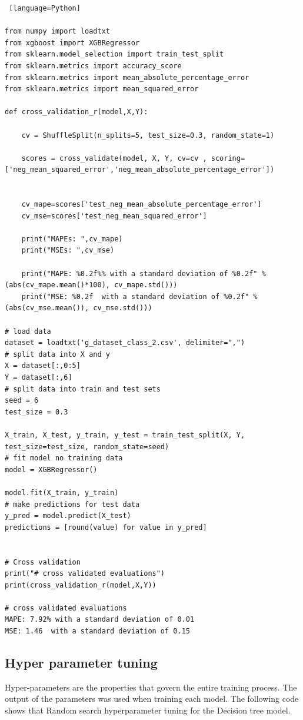 \begin{lstlisting} [language=Python]

from numpy import loadtxt
from xgboost import XGBRegressor
from sklearn.model_selection import train_test_split
from sklearn.metrics import accuracy_score
from sklearn.metrics import mean_absolute_percentage_error
from sklearn.metrics import mean_squared_error

def cross_validation_r(model,X,Y):

	cv = ShuffleSplit(n_splits=5, test_size=0.3, random_state=1)
	
	scores = cross_validate(model, X, Y, cv=cv , scoring=['neg_mean_squared_error','neg_mean_absolute_percentage_error'])
	
	
	cv_mape=scores['test_neg_mean_absolute_percentage_error']
	cv_mse=scores['test_neg_mean_squared_error']
	
	print("MAPEs: ",cv_mape)
	print("MSEs: ",cv_mse)
	
	print("MAPE: %0.2f%% with a standard deviation of %0.2f" % (abs(cv_mape.mean()*100), cv_mape.std()))
	print("MSE: %0.2f  with a standard deviation of %0.2f" % (abs(cv_mse.mean()), cv_mse.std()))
	
# load data
dataset = loadtxt('g_dataset_class_2.csv', delimiter=",")
# split data into X and y
X = dataset[:,0:5]
Y = dataset[:,6]
# split data into train and test sets
seed = 6
test_size = 0.3

X_train, X_test, y_train, y_test = train_test_split(X, Y, test_size=test_size, random_state=seed)
# fit model no training data
model = XGBRegressor()

model.fit(X_train, y_train)
# make predictions for test data
y_pred = model.predict(X_test)
predictions = [round(value) for value in y_pred]


# Cross validation
print("# cross validated evaluations")
print(cross_validation_r(model,X,Y))

# cross validated evaluations
MAPE: 7.92% with a standard deviation of 0.01
MSE: 1.46  with a standard deviation of 0.15

\end{lstlisting}


\subsection{Hyper parameter tuning}

Hyper-parameters are the properties that govern the entire training process. The output of the parameters was used when training each model. The following code shows that Random search hyperparameter tuning for the Decision tree model.

